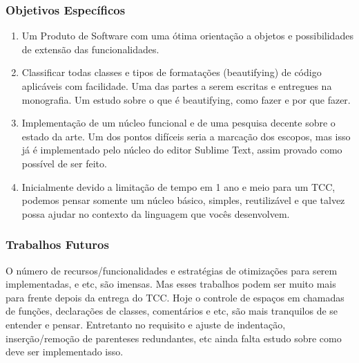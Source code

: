 \subsubsection{Objetivos Específicos}


    \begin{enumerate}[leftmargin=*]

        \item

        Um Produto de Software com uma ótima orientação a objetos e possibilidades de extensão das
        funcionalidades.

        \item

        Classificar todas classes e tipos de formatações (beautifying) de código aplicáveis com
        facilidade. Uma das partes a serem escritas e entregues na monografia. Um estudo sobre o que
        é beautifying, como fazer e por que fazer.

        \item

        Implementação de um núcleo funcional e de uma pesquisa decente sobre o estado da arte. Um
        dos pontos difíceis seria a marcação dos escopos, mas isso já é implementado pelo núcleo do
        editor Sublime Text, assim provado como possível de ser feito.

        \item

        Inicialmente devido a limitação de tempo em 1 ano e meio para um TCC, podemos pensar somente
        um núcleo básico, simples, reutilizável e que talvez possa ajudar no contexto da linguagem
        que vocês desenvolvem.

    \end{enumerate}


\subsubsection{Trabalhos Futuros}

    O número de recursos/funcionalidades e estratégias de otimizações para serem implementadas, e
    etc, são imensas. Mas esses trabalhos podem ser muito mais para frente depois da entrega do TCC.
    Hoje o controle de espaços em chamadas de funções, declarações de classes, comentários e etc,
    são mais tranquilos de se entender e pensar. Entretanto no requisito e ajuste de indentação,
    inserção/remoção de parenteses redundantes, etc ainda falta estudo sobre como deve ser
    implementado isso.

